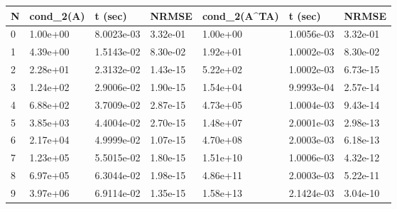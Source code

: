 \documentclass{article}
\begin{document}
\begin{table}[]
\begin{tabular}{|l|l|l|l|l|l|l|}
\hline
N & cond\_2(A) & t (sec)    & NRMSE    & cond\_2(A\textasciicircum{}TA) & t (sec)    & NRMSE    \\ \hline
0 & 1.00e+00   & 8.0023e-03 & 3.32e-01 & 1.00e+00                       & 1.0056e-03 & 3.32e-01 \\ \hline
1 & 4.39e+00   & 1.5143e-02 & 8.30e-02 & 1.92e+01                       & 1.0002e-03 & 8.30e-02 \\ \hline
2 & 2.28e+01   & 2.3132e-02 & 1.43e-15 & 5.22e+02                       & 1.0002e-03 & 6.73e-15 \\ \hline
3 & 1.24e+02   & 2.9006e-02 & 1.90e-15 & 1.54e+04                       & 9.9993e-04 & 2.57e-14 \\ \hline
4 & 6.88e+02   & 3.7009e-02 & 2.87e-15 & 4.73e+05                       & 1.0004e-03 & 9.43e-14 \\ \hline
5 & 3.85e+03   & 4.4004e-02 & 2.70e-15 & 1.48e+07                       & 2.0001e-03 & 2.98e-13 \\ \hline
6 & 2.17e+04   & 4.9999e-02 & 1.07e-15 & 4.70e+08                       & 2.0003e-03 & 6.18e-13 \\ \hline
7 & 1.23e+05   & 5.5015e-02 & 1.80e-15 & 1.51e+10                       & 1.0006e-03 & 4.32e-12 \\ \hline
8 & 6.97e+05   & 6.3044e-02 & 1.98e-15 & 4.86e+11                       & 2.0003e-03 & 5.22e-11 \\ \hline
9 & 3.97e+06   & 6.9114e-02 & 1.35e-15 & 1.58e+13                       & 2.1424e-03 & 3.04e-10 \\ \hline
\end{tabular}
\end{table}
\end{document}
